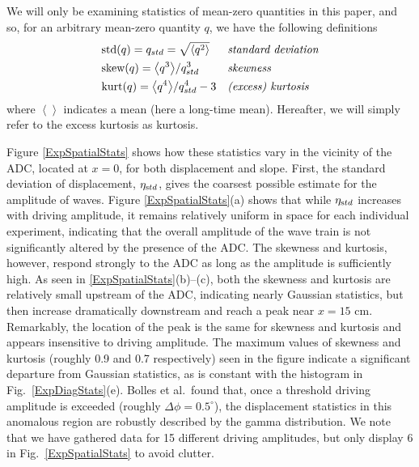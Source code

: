 \documentclass[11pt]{article}
\newcommand{\mean}[1]{\left< #1 \right>}
\newcommand{\etastd}{\eta_{\text std}}
\newcommand{\Dphi}{\Delta \phi}
\newcommand{\skw}{\text{skew}}
\newcommand{\var}{\text{var}}
\newcommand{\kurt}{\text{kurt}}
\newcommand{\std}{\text{std}}
\begin{document}
	We will only be examining statistics of mean-zero quantities in this paper, and so, for an arbitrary mean-zero quantity $q$, we have the following definitions
\begin{align}
& \std(q) = q_{std}= \sqrt{\mean{q^2}}
&&\mbox{\em standard deviation} \\
& \skw(q) = {\mean{q^3}} / {q_{std}^3}	
&&\mbox{\em skewness} \\
& \kurt(q) = {\mean{q^4}} / {q_{std}^4} - 3
&&\mbox{\em (excess) kurtosis}
\end{align}
where $\mean{}$ indicates a mean (here a long-time mean). Hereafter, we will simply refer to the excess kurtosis as kurtosis.
 
	Figure \ref{ExpSpatialStats} shows how these statistics vary in the vicinity of the ADC, located at $x = 0$, for both displacement and slope. First, the standard deviation of displacement, $\etastd$, gives the coarsest possible estimate for the amplitude of waves. Figure \ref{ExpSpatialStats}(a) shows that while $\etastd$ increases with driving amplitude, it remains relatively uniform in space for each individual experiment, indicating that the overall amplitude of the wave train is not significantly altered by the presence of the ADC. The skewness and kurtosis, however, respond strongly to the ADC as long as the amplitude is sufficiently high. As seen in \ref{ExpSpatialStats}(b)--(c), both the skewness and kurtosis are relatively small upstream of the ADC, indicating nearly Gaussian statistics, but then increase dramatically downstream and reach a peak near $x = 15$ cm. Remarkably, the location of the peak is the same for skewness and kurtosis and appears insensitive to driving amplitude. The maximum values of skewness and kurtosis (roughly 0.9 and 0.7 respectively) seen in the figure indicate a significant departure from Gaussian statistics, as is constant with the histogram in Fig.~\ref{ExpDiagStats}(e). Bolles et al.~found that, once a threshold driving amplitude is exceeded (roughly $\Dphi = 0.5^{\circ}$), the displacement statistics in this anomalous region are robustly described by the gamma distribution. We note that we have gathered data for 15 different driving amplitudes, but only display 6 in Fig.~\ref{ExpSpatialStats} to avoid clutter. 
 
\end{document}
